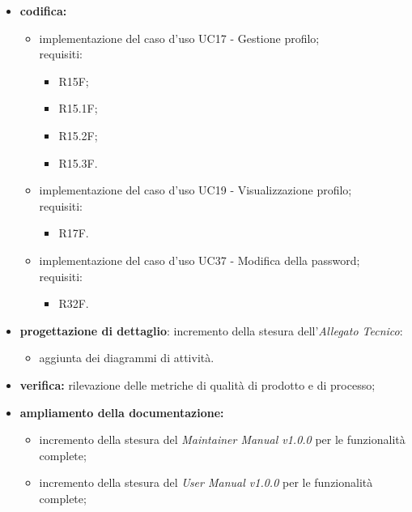 \begin{itemize}
    \item \textbf{codifica:}
          \begin{itemize}
              \item implementazione del caso d'uso UC17 - Gestione profilo;\\
                    requisiti:
                    \begin{itemize}
                        \item R15F;
                        \item R15.1F;
                        \item R15.2F;
                        \item R15.3F.
                    \end{itemize}
              \item implementazione del caso d'uso UC19 - Visualizzazione profilo;\\
                    requisiti:
                    \begin{itemize}
                        \item R17F.
                    \end{itemize}
              \item implementazione del caso d'uso UC37 - Modifica della password;\\
                    requisiti:
                    \begin{itemize}
                        \item R32F.
                    \end{itemize}
          \end{itemize}
    \item \textbf{progettazione di dettaglio}: incremento della stesura dell'\textit{Allegato Tecnico}:
          \begin{itemize}
              \item aggiunta dei diagrammi di attività.
          \end{itemize}
    \item \textbf{verifica:} rilevazione delle metriche di qualità di prodotto e di processo;
    \item \textbf{ampliamento della documentazione:}
          \begin{itemize}
              \item incremento della stesura del \textit{Maintainer Manual v1.0.0} per le funzionalità complete;
              \item incremento della stesura del \textit{User Manual v1.0.0} per le funzionalità complete;

\end{itemize}
\end{itemize}
